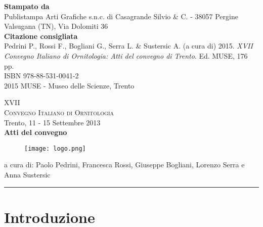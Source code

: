 \documentclass[10pt,twoside,openright,x11names,svgnames,italian,a4paper,dvipsnames,table]{memoir}
\renewcommand*\copyright{{%
  \usefont{EU1}{lmr}{m}{n}\textcopyright}}
\begin{document}
{\vspace{.3cm}
\textbf{\color{MUSEBLUE}Stampato da} \\
Publistampa Arti Grafiche s.n.c. di Casagrande Silvio \& C. - 38057 Pergine Valsugana (TN), Via Dolomiti 36\\
\vspace{.2cm}
{\footnotesize
\textbf{\color{MUSEBLUE}Citazione consigliata} \\
Pedrini P., Rossi F., Bogliani G., Serra L. \& Sustersic A. (a cura di) 2015. \emph{XVII Convegno Italiano di Ornitologia: Atti del convegno di Trento}. Ed. MUSE, 176 pp. \\
}
\vspace{.7cm}
ISBN 978-88-531-0041-2 \\
\copyright  2015 MUSE - Museo delle Scienze, Trento \\
}

\newpage
\begin{adjustwidth}{-1cm}{-1cm}
{
\raggedright
\vspace*{4cm}
{\fontsize{1.5cm}{2em}\selectfont \color{MUSEBLUE!70!black} \textsc{XVII \\Convegno Italiano di Ornitologia}} \\[.2cm]
{\large Trento, 11 - 15 Settembre 2013} \\[.5cm]
{\HUGE \textbf{Atti del convegno}} \\[1cm]
}
\begin{center}
\begin{figure}[!h]
\texttt{[image: logo.png]}
\end{figure}
\end{center}
\vspace{7.5cm}
a cura di: Paolo Pedrini, Francesca Rossi, Giuseppe Bogliani, Lorenzo Serra e Anna Sustersic \\
\noindent\color{MUSEBLUE}\rule{27cm}{2pt}
\vspace*{\fill}
\end{adjustwidth}

\cleardoublepage
\pagestyle{CIOpage}
\begin{KeepFromToc}
	\tableofcontents
\end{KeepFromToc}

\part{Introduzione}
\end{document}
